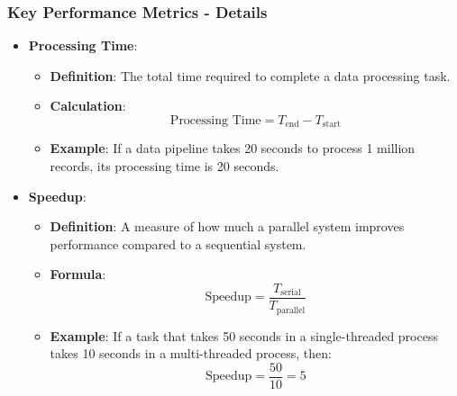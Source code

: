 \documentclass[aspectratio=169]{beamer}
\begin{document}
\begin{frame}[fragile]
    \frametitle{Key Performance Metrics - Details}
    \begin{itemize}
        \item \textbf{Processing Time}:
        \begin{itemize}
            \item \textbf{Definition}: The total time required to complete a data processing task.
            \item \textbf{Calculation}:
            \begin{equation*}
                \text{Processing Time} = T_{\text{end}} - T_{\text{start}}
            \end{equation*}
            \item \textbf{Example}: If a data pipeline takes 20 seconds to process 1 million records, its processing time is 20 seconds.
        \end{itemize}

        \item \textbf{Speedup}:
        \begin{itemize}
            \item \textbf{Definition}: A measure of how much a parallel system improves performance compared to a sequential system.
            \item \textbf{Formula}:
            \begin{equation*}
                \text{Speedup} = \frac{T_{\text{serial}}}{T_{\text{parallel}}}
            \end{equation*}
            \item \textbf{Example}: If a task that takes 50 seconds in a single-threaded process takes 10 seconds in a multi-threaded process, then:
            \begin{equation*}
                \text{Speedup} = \frac{50}{10} = 5
            \end{equation*}
        \end{itemize}
    \end{itemize}
\end{frame}
\end{document}
